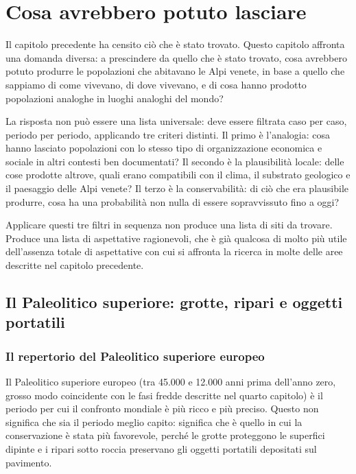 \chapter{Cosa avrebbero potuto lasciare}
\label{cap:repertorio_simbolico}

Il capitolo precedente ha censito ciò che è stato trovato. Questo capitolo affronta una domanda diversa: a prescindere da quello che è stato trovato, cosa avrebbero potuto produrre le popolazioni che abitavano le Alpi venete, in base a quello che sappiamo di come vivevano, di dove vivevano, e di cosa hanno prodotto popolazioni analoghe in luoghi analoghi del mondo?

La risposta non può essere una lista universale: deve essere filtrata caso per caso, periodo per periodo, applicando tre criteri distinti. Il primo è l'analogia: cosa hanno lasciato popolazioni con lo stesso tipo di organizzazione economica e sociale in altri contesti ben documentati? Il secondo è la plausibilità locale: delle cose prodotte altrove, quali erano compatibili con il clima, il substrato geologico e il paesaggio delle Alpi venete? Il terzo è la conservabilità: di ciò che era plausibile produrre, cosa ha una probabilità non nulla di essere sopravvissuto fino a oggi?

Applicare questi tre filtri in sequenza non produce una lista di siti da trovare. Produce una lista di aspettative ragionevoli, che è già qualcosa di molto più utile dell'assenza totale di aspettative con cui si affronta la ricerca in molte delle aree descritte nel capitolo precedente.

\section{Il Paleolitico superiore: grotte, ripari e oggetti portatili}

\subsection{Il repertorio del Paleolitico superiore europeo}

Il Paleolitico superiore europeo (tra 45.000 e 12.000 anni prima dell'anno zero, grosso modo coincidente con le fasi fredde descritte nel quarto capitolo) è il periodo per cui il confronto mondiale è più ricco e più preciso. Questo non significa che sia il periodo meglio capito: significa che è quello in cui la conservazione è stata più favorevole, perché le grotte proteggono le superfici dipinte e i ripari sotto roccia preservano gli oggetti portatili depositati sul pavimento.

